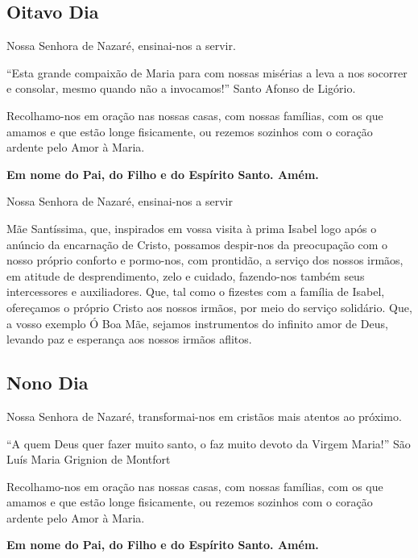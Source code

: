\documentclass[a4paper,14pt]{extarticle} \usepackage[utf8]{inputenc}
\begin{document}
\textbf{}

\subsection{Oitavo Dia}

\textbf{}

Nossa Senhora de Nazaré, ensinai-nos a servir.

“Esta grande compaixão de Maria para com nossas misérias a leva a nos socorrer e consolar, mesmo quando não a invocamos!” Santo Afonso de Ligório.

Recolhamo-nos em oração nas nossas casas, com nossas famílias, com os que amamos e que estão longe fisicamente, ou rezemos sozinhos com o coração ardente pelo Amor à Maria.

\textbf{Em nome do Pai, do Filho e do Espírito Santo. Amém.}

Nossa Senhora de Nazaré, ensinai-nos a servir

Mãe Santíssima, que, inspirados em vossa visita à prima Isabel logo após o anúncio da encarnação de Cristo, possamos despir-nos da preocupação com o nosso próprio conforto e pormo-nos, com prontidão, a serviço dos nossos irmãos, em atitude de desprendimento, zelo e cuidado, fazendo-nos também seus intercessores e auxiliadores. Que, tal como o fizestes com a família de Isabel, ofereçamos o próprio Cristo aos nossos irmãos, por meio do serviço solidário. Que, a vosso exemplo Ó Boa Mãe, sejamos instrumentos do infinito amor de Deus, levando paz e esperança aos nossos irmãos aflitos.

\textbf{}

\subsection{Nono Dia}

\textbf{}

Nossa Senhora de Nazaré, transformai-nos em cristãos mais atentos ao próximo.

“A quem Deus quer fazer muito santo, o faz muito devoto da Virgem Maria!” São Luís Maria Grignion de Montfort

Recolhamo-nos em oração nas nossas casas, com nossas famílias, com os que amamos e que estão longe fisicamente, ou rezemos sozinhos com o coração ardente pelo Amor à Maria.

\textbf{Em nome do Pai, do Filho e do Espírito Santo. Amém.}
\end{document}
